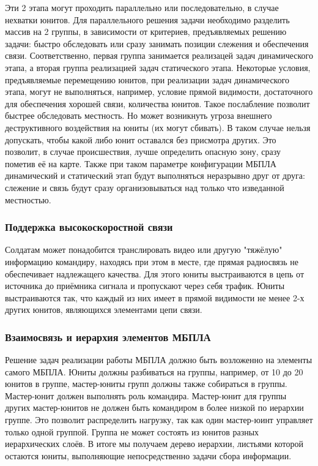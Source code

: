 Эти 2 этапа могут проходить параллельно или последовательно, в случае
нехватки юнитов. Для параллельного решения задачи необходимо разделить
массив на 2 группы, в зависимости от критериев, предъявляемых 
решению задачи: быстро обследовать или сразу занимать позиции слежения и 
обеспечения связи. Соответственно, первая группа занимается реализацей
задач динамического этапа, а вторая группа реализацией задач
статического этапа. Некоторые условия, предъявляемые перемещению юнитов,
при реализации задач динамического этапа, могут не выполняться, например,
условие прямой видимости, достаточного для обеспечения хорошей связи,
количества юнитов. Такое послабление позволит быстрее обследовать
местность. Но может возникнуть угроза внешнего деструктивного воздействия
на юниты (их могут сбивать). В таком случае нельзя допускать, чтобы 
какой либо юнит оставался без присмотра других. Это позволит, в случае
происшествия, лучше определить опасную зону, сразу пометив её на карте.
Также при таком параметре конфигурации МБПЛА динамический и статический
этап будут выполняться неразрывно друг от друга: слежение и связь будут
сразу организовываться над только что изведанной местностью.

\subsubsection{Поддержка высокоскоростной связи}

Солдатам может понадобится транслировать видео или другую
"тяжёлую" информацию командиру, находясь при этом в месте,
где прямая радиосвязь не обеспечивает надлежащего качества.
Для этого юниты выстраиваются в цепь от источника до приёмника
сигнала и пропускают через себя трафик. Юниты выстраиваются так,
что каждый из них имеет в прямой видимости не менее 2-х других
юнитов, являющихся элементами цепи связи.

\subsubsection{Взаимосвязь и иерархия элементов МБПЛА}

Решение задач реализации работы МБПЛА должно быть возложенно на элементы
самого МБПЛА. Юниты должны разбиваться на группы, например,
от 10 до 20 юнитов в группе, мастер-юниты групп должны также собираться
в группы. Мастер-юнит должен выполнять роль командира. Мастер-юнит для
группы других мастер-юнитов не должен быть командиром в более низкой по
иерархии группе. Это позволит распределить нагрузку, так как один мастер-юинт
управляет только одной группой. Группа не может состоять из юнитов разных
иерархических слоёв. В итоге мы получаем дерево иерархии, листьями которой
остаются юниты, выполняющие непосредственно задачи сбора информации.

